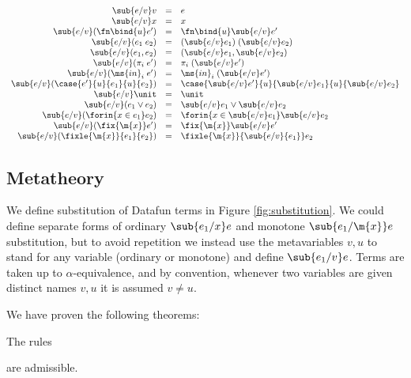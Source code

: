 
\begin{figure*}
  \[\begin{array}{rcll}
    \sub{e/v} v &=& e\\
    \sub{e/v} x &=& x\\
    \sub{e/v} (\fn\bind{u} e') &=& \fn\bind{u} \sub{e/v} e'\\
    \sub{e/v} (e_1 \;e_2) &=& (\sub{e/v} e_1)\;(\sub{e/v} e_2)\\
    \sub{e/v} (e_1, e_2) &=& (\sub{e/v} e_1, \sub{e/v} e_2)\\
    \sub{e/v} (\pi_i\;e') &=& \pi_i\;(\sub{e/v}e')\\
    \sub{e/v} (\ms{in}_i\;e') &=& \ms{in}_i \;(\sub{e/v} e')\\
    \sub{e/v} (\case{e'}{u}{e_1}{u}{e_2})
    &=& \case{\sub{e/v} e'}{u}{\sub{e/v} e_1}{u}{\sub{e/v} e_2}\\
    \sub{e/v} \unit &=& \unit\\
    \sub{e/v} (e_1 \vee e_2) &=& \sub{e/v} e_1 \vee \sub{e/v} e_2\\
    \sub{e/v} (\forin{x \in e_1} e_2)
    &=& \forin{x \in \sub{e/v} e_1} \sub{e/v} e_2\\
    \sub{e/v} (\fix{\m{x}} e') &=& \fix{\m{x}} \sub{e/v} e'\\
    \sub{e/v} (\fixle{\m{x}}{e_1}{e_2}) &=& \fixle{\m{x}}{\sub{e/v}{e_1}} e_2
  \end{array}\]
  \caption{Substitution}
  \label{fig:substitution}
\end{figure*}


\subsection{Metatheory}

We define substitution of Datafun terms in Figure \ref{fig:substitution}. We
could define separate forms of ordinary $\sub{e_1/x} e$ and monotone
$\sub{e_1/\m{x}} e$ substitution, but to avoid repetition we instead use the
metavariables $v,u$ to stand for any variable (ordinary or monotone) and define
$\sub{e_1/v} e$. Terms are taken up to $\alpha$-equivalence, and by convention,
whenever two variables are given distinct names $v,u$ it is assumed $v \ne u$.

We have proven the following theorems:

\begin{theorem}
  The rules 
  are admissible.
\end{theorem}


